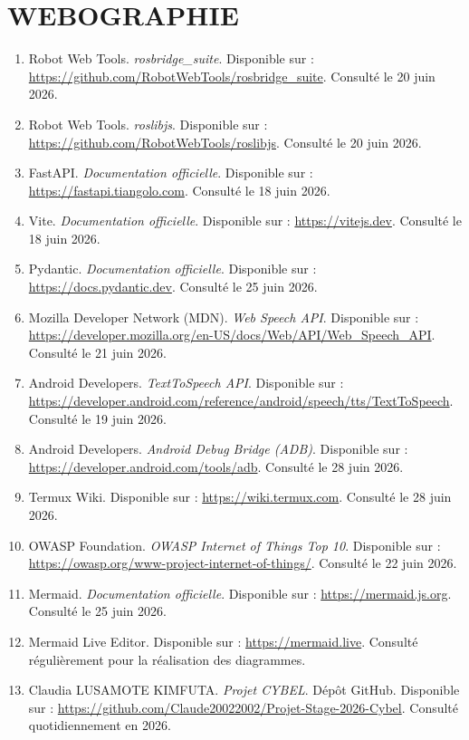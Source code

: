 \section*{\centering WEBOGRAPHIE}

\begin{enumerate}
    \item Robot Web Tools. \textit{rosbridge\_suite}. Disponible sur :
    \url{https://github.com/RobotWebTools/rosbridge_suite}. Consulté le 20 juin 2026.

    \item Robot Web Tools. \textit{roslibjs}. Disponible sur :
    \url{https://github.com/RobotWebTools/roslibjs}. Consulté le 20 juin 2026.

    \item FastAPI. \textit{Documentation officielle}. Disponible sur :
    \url{https://fastapi.tiangolo.com}. Consulté le 18 juin 2026.

    \item Vite. \textit{Documentation officielle}. Disponible sur :
    \url{https://vitejs.dev}. Consulté le 18 juin 2026.

    \item Pydantic. \textit{Documentation officielle}. Disponible sur :
    \url{https://docs.pydantic.dev}. Consulté le 25 juin 2026.

    \item Mozilla Developer Network (MDN). \textit{Web Speech API}. Disponible sur :
    \url{https://developer.mozilla.org/en-US/docs/Web/API/Web_Speech_API}. Consulté le 21 juin 2026.

    \item Android Developers. \textit{TextToSpeech API}. Disponible sur :
    \url{https://developer.android.com/reference/android/speech/tts/TextToSpeech}. Consulté le 19 juin 2026.

    \item Android Developers. \textit{Android Debug Bridge (ADB)}. Disponible sur :
    \url{https://developer.android.com/tools/adb}. Consulté le 28 juin 2026.

    \item Termux Wiki. Disponible sur :
    \url{https://wiki.termux.com}. Consulté le 28 juin 2026.

    \item OWASP Foundation. \textit{OWASP Internet of Things Top 10}. Disponible sur :
    \url{https://owasp.org/www-project-internet-of-things/}. Consulté le 22 juin 2026.

    \item Mermaid. \textit{Documentation officielle}. Disponible sur :
    \url{https://mermaid.js.org}. Consulté le 25 juin 2026.

    \item Mermaid Live Editor. Disponible sur :
    \url{https://mermaid.live}. Consulté régulièrement pour la réalisation des diagrammes.

    \item Claudia LUSAMOTE KIMFUTA. \textit{Projet CYBEL}. Dépôt GitHub. Disponible sur :
    \url{https://github.com/Claude20022002/Projet-Stage-2026-Cybel}. Consulté quotidiennement en 2026.
\end{enumerate}
